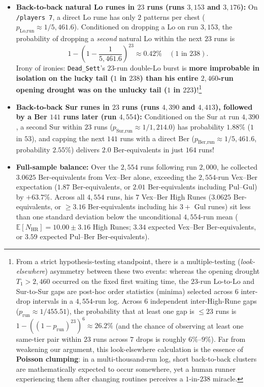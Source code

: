 \documentclass[11pt,reqno]{amsart}
\theoremstyle{definition}
\begin{document}
\begin{itemize}
    \item \textbf{Back-to-back natural Lo runes in $23$ runs (runs $3{,}153$ and $3{,}176$):} On \texttt{/players~7}, a direct Lo rune has only $2$ patterns per chest ($p_{\text{Lo,run}} \approx 1 / 5{,}461.6$). Conditioned on dropping a Lo on run $3{,}153$, the probability of dropping a \emph{second} natural Lo within the next $23$ runs is
    \[
        1 - \left(1 - \frac{1}{5{,}461.6}\right)^{23} \approx \mathbf{0.42\%} \quad \left(\text{1 in } 238\right).
    \]
    Irony of ironies: \texttt{Dead\_Sett}'s $23$-run double-Lo burst is \textbf{more improbable in isolation on the lucky tail ($1$ in $238$) than his entire $2{,}460$-run opening drought was on the unlucky tail ($1$ in $223$)}!\footnote{From a strict hypothesis-testing standpoint, there is a multiple-testing (\emph{look-elsewhere}) asymmetry between these two events: whereas the opening drought $T_1 > 2{,}460$ occurred on the fixed first waiting time, the $23$-run Lo-to-Lo and Sur-to-Sur gaps are post-hoc order statistics (minima) selected across $6$ inter-drop intervals in a $4{,}554$-run log. Across $6$ independent inter-High-Rune gaps ($p_{\text{run}} \approx 1/455.51$), the probability that at least one gap is $\le 23$ runs is $1 - ((1 - p_{\text{run}})^{23})^6 \approx 26.2\%$ (and the chance of observing at least one same-tier pair within $23$ runs across $7$ drops is roughly $6\%$--$9\%$). Far from weakening our argument, this look-elsewhere calculation is the essence of \textbf{Poisson clumping}: in a multi-thousand-run log, short back-to-back clusters are mathematically expected to occur somewhere, yet a human runner experiencing them after changing routines perceives a $1$-in-$238$ miracle.}
    \item \textbf{Back-to-back Sur runes in $23$ runs (runs $4{,}390$ and $4{,}413$), followed by a Ber $141$ runs later (run $4{,}554$):} Conditioned on the Sur at run $4{,}390$, a second Sur within $23$ runs ($p_{\text{Sur,run}} \approx 1 / 1{,}214.0$) has probability $1.88\%$ ($1$ in $53$), and capping the next $141$ runs with a direct Ber ($p_{\text{Ber,run}} \approx 1 / 5{,}461.6$, probability $2.55\%$) delivers $2.0$ Ber-equivalents in just $164$ runs!
    \item \textbf{Full-sample balance:} Over the $2{,}554$ runs following run $2{,}000$, he collected $3.0625$ Ber-equivalents from Vex--Ber alone, exceeding the $2{,}554$-run Vex--Ber expectation ($1.87$ Ber-equivalents, or $2.01$ Ber-equivalents including Pul--Gul) by $+63.7\%$. Across all $4{,}554$ runs, his $7$ Vex--Ber High Runes ($3.0625$ Ber-equivalents, or $\ge 3.16$ Ber-equivalents including his $3+$ Gul runes) sit less than one standard deviation below the unconditional $4{,}554$-run mean ($\mathbb{E}[N_{\text{HR}}] = 10.00 \pm 3.16$ High Runes; $3.34$ expected Vex--Ber Ber-equivalents, or $3.59$ expected Pul--Ber Ber-equivalents).
\end{itemize}
\end{document}
